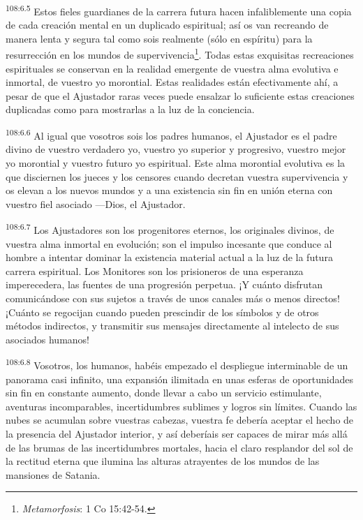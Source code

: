 \documentclass[twoside, 11pt]{book}
\begin{document}
\par
\textsuperscript{108:6.5} Estos fieles guardianes de la carrera futura hacen infaliblemente una copia de cada creación mental en un duplicado espiritual; así os van recreando de manera lenta y segura tal como sois realmente (sólo en espíritu) para la resurrección en los mundos de supervivencia\footnote{\textit{Metamorfosis}: 1 Co 15:42-54.}. Todas estas exquisitas recreaciones espirituales se conservan en la realidad emergente de vuestra alma evolutiva e inmortal, de vuestro yo morontial. Estas realidades están efectivamente ahí, a pesar de que el Ajustador raras veces puede ensalzar lo suficiente estas creaciones duplicadas como para mostrarlas a la luz de la conciencia.

\par
\textsuperscript{108:6.6} Al igual que vosotros sois los padres humanos, el Ajustador es el padre divino de vuestro verdadero yo, vuestro yo superior y progresivo, vuestro mejor yo morontial y vuestro futuro yo espiritual. Este alma morontial evolutiva es la que disciernen los jueces y los censores cuando decretan vuestra supervivencia y os elevan a los nuevos mundos y a una existencia sin fin en unión eterna con vuestro fiel asociado ---Dios, el Ajustador.

\par
\textsuperscript{108:6.7} Los Ajustadores son los progenitores eternos, los originales divinos, de vuestra alma inmortal en evolución; son el impulso incesante que conduce al hombre a intentar dominar la existencia material actual a la luz de la futura carrera espiritual. Los Monitores son los prisioneros de una esperanza imperecedera, las fuentes de una progresión perpetua. ¡Y cuánto disfrutan comunicándose con sus sujetos a través de unos canales más o menos directos! ¡Cuánto se regocijan cuando pueden prescindir de los símbolos y de otros métodos indirectos, y transmitir sus mensajes directamente al intelecto de sus asociados humanos!

\par
\textsuperscript{108:6.8} Vosotros, los humanos, habéis empezado el despliegue interminable de un panorama casi infinito, una expansión ilimitada en unas esferas de oportunidades sin fin en constante aumento, donde llevar a cabo un servicio estimulante, aventuras incomparables, incertidumbres sublimes y logros sin límites. Cuando las nubes se acumulan sobre vuestras cabezas, vuestra fe debería aceptar el hecho de la presencia del Ajustador interior, y así deberíais ser capaces de mirar más allá de las brumas de las incertidumbres mortales, hacia el claro resplandor del sol de la rectitud eterna que ilumina las alturas atrayentes de los mundos de las mansiones de Satania.
\end{document}
